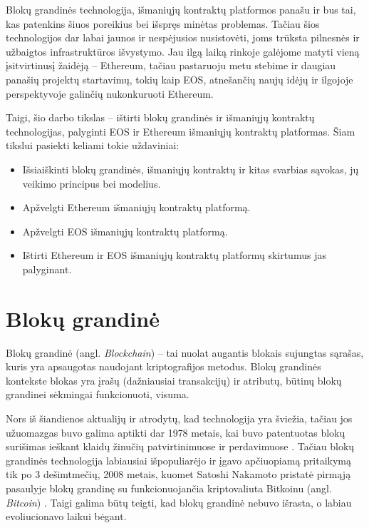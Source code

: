 \documentclass{VUMIFPSkursinis}
\begin{document}
Blokų grandinės technologija, išmaniųjų kontraktų platformos panašu ir bus tai, kas patenkins šiuos poreikius bei išspręs minėtas problemas. Tačiau šios technologijos dar labai jaunos ir nespėjusios nusistovėti, joms trūksta pilnesnės ir užbaigtos infrastruktūros išvystymo. Jau ilgą laiką rinkoje galėjome matyti vieną įsitvirtinusį žaidėją – Ethereum, tačiau pastaruoju metu stebime ir daugiau panašių projektų startavimų, tokių kaip EOS, atnešančių naujų idėjų ir ilgojoje perspektyvoje galinčių nukonkuruoti Ethereum.

Taigi, šio darbo tikslas – ištirti blokų grandinės ir išmaniųjų kontraktų technologijas, palyginti EOS ir Ethereum išmaniųjų kontraktų platformas. Šiam tikslui pasiekti keliami tokie uždaviniai:


\begin{itemize}
    \item Išsiaiškinti blokų grandinės, išmaniųjų kontraktų ir kitas svarbias sąvokas, jų veikimo principus bei modelius.
    \item Apžvelgti Ethereum išmaniųjų kontraktų platformą.
    \item Apžvelgti EOS išmaniųjų kontraktų platformą.
    \item Ištirti Ethereum ir EOS išmaniųjų kontraktų platformų skirtumus jas palyginant.
\end{itemize}

\section{Blokų grandinė}
Blokų grandinė (angl. \textit{Blockchain}) – tai nuolat augantis blokais sujungtas sąrašas, kuris yra apsaugotas naudojant kriptografijos metodus. Blokų grandinės kontekste blokas yra įrašų (dažniausiai transakcijų) ir atributų, būtinų blokų grandinei sėkmingai funkcionuoti, visuma.

Nors iš šiandienos aktualijų ir atrodytų, kad technologija yra šviežia, tačiau jos užuomazgas buvo galima aptikti dar 1978 metais, kai buvo patentuotas blokų surišimas ieškant klaidų žinučių patvirtinimuose ir perdavimuose \cite{ehrsam1978message}. Tačiau blokų grandinės technologija labiausiai išpopuliarėjo ir įgavo apčiuopiamą pritaikymą tik po 3 dešimtmečių, 2008 metais, kuomet Satoshi Nakamoto pristatė pirmąją pasaulyje blokų grandinę su funkcionuojančia kriptovaliuta Bitkoinu (angl. \textit{Bitcoin}) \cite{nakamoto2008bitcoin}. Taigi galima būtų teigti, kad blokų grandinė nebuvo išrasta, o labiau evoliucionavo laikui bėgant.
\end{document}
